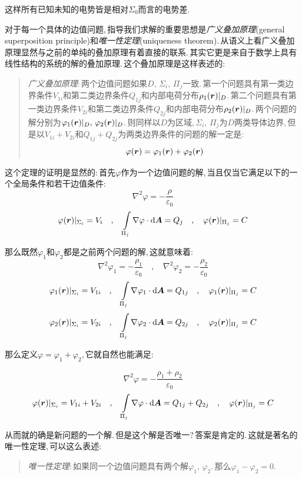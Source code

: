 这样所有已知未知的电势皆是相对$\Sigma_0$而言的电势差.


对于每一个具体的边值问题,\,指导我们求解的重要思想是\emph{广义叠加原理}(general superposition principle)和\emph{唯一性定理}(uniqueness theorem).\,从语义上看广义叠加原理显然与之前的单纯的叠加原理有着直接的联系.\,其实它更是来自于数学上具有线性结构的系统的解的叠加原理.\,这个叠加原理是这样表述的:
\begin{verse}
\emph{广义叠加原理}:\,两个边值问题如果$D,\,\Sigma_i,\,\Pi_j$一致.\,第一个问题具有第一类边界条件$V_{1i}$和第二类边界条件$Q_{1j}$和内部电荷分布$\rho_1(\boldsymbol{r})|_D$.\,第二个问题具有第一类边界条件$V_{2i}$和第二类边界条件$Q_{2j}$和内部电荷分布$\rho_2(\boldsymbol{r})|_D$.\,两个问题的解分别为$\varphi_1(\boldsymbol{r})|_D,\,\varphi_2(\boldsymbol{r})|_D$.\,则同样以$D$为区域,\,$\Sigma_i,\,\Pi_j$为$D$两类导体边界,\,但是以$V_{1i}+V_{2i}$和$Q_{1j}+Q_{2j}$为两类边界条件的问题的解一定是:
\[\varphi(\boldsymbol{r})=\varphi_1(\boldsymbol{r})+\varphi_2(\boldsymbol{r})\]
\end{verse}

这个定理的证明是显然的:\,首先$\varphi$作为一个边值问题的解,\,当且仅当它满足以下的一个全局条件和若干边值条件:
\[\nabla^2\varphi=-\frac{\rho}{\varepsilon_0}\]
\[\varphi(\boldsymbol{r})|_{\Sigma_i}=V_i \quad, \quad \int\limits_{\Pi_j}\nabla\varphi\cdot \textrm{d} \boldsymbol{A}=Q_j \quad, \quad \varphi(\boldsymbol{r})|_{\Pi_j}=C\]

那么既然$\varphi_1$和$\varphi_2$都是之前两个问题的解,\,这就意味着:
\[\nabla^2\varphi_1=-\frac{\rho_1}{\varepsilon_0} \quad,\quad \nabla^2\varphi_2=-\frac{\rho_2}{\varepsilon_0}\]
\[\varphi_1(\boldsymbol{r})|_{\Sigma_i}=V_{1i} \quad, \quad \int\limits_{\Pi_j}\nabla\varphi_1\cdot \textrm{d} \boldsymbol{A}=Q_{1j} \quad, \quad \varphi_1(\boldsymbol{r})|_{\Pi_j}=C\]
\[\varphi_2(\boldsymbol{r})|_{\Sigma_i}=V_{2i} \quad, \quad \int\limits_{\Pi_j}\nabla\varphi_2\cdot \textrm{d} \boldsymbol{A}=Q_{2j} \quad, \quad \varphi_2(\boldsymbol{r})|_{\Pi_j}=C\]

那么定义$\varphi=\varphi_1+\varphi_2$,\,它就自然也能满足:

\[\nabla^2\varphi=-\frac{\rho_1+\rho_2}{\varepsilon_0}\]
\[\varphi(\boldsymbol{r})|_{\Sigma_i}=V_{1i}+V_{2i} \quad, \quad \int\limits_{\Pi_j}\nabla\varphi\cdot \textrm{d} \boldsymbol{A}=Q_{1j}+Q_{2j} \quad, \quad \varphi(\boldsymbol{r})|_{\Pi_j}=C\]

从而就的确是新问题的一个解.\,但是这个解是否唯一?\,答案是肯定的.\,这就是著名的唯一性定理,\,可以这么表述:
\begin{verse}
\emph{唯一性定理}:\,如果同一个边值问题具有两个解$\varphi_1,\,\varphi_2$.\,那么$\varphi_1-\varphi_2= 0$.
\end{verse} 	 


